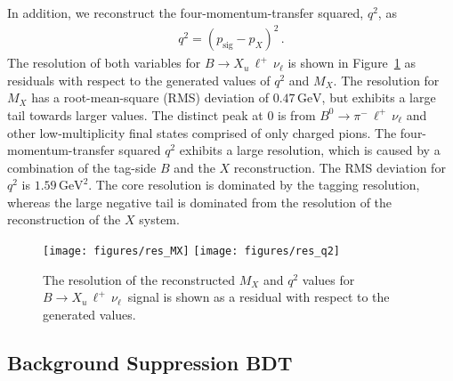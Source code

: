 \documentclass[twocolumn,aps,prd,superscriptaddress,nofootinbib,floatfix,preprintnumbers,a4]{revtex4-1}
\newcommand{\bulnu}{\ensuremath{B \to X_u \, \ell^+\, \nu_{\ell}}\xspace}
\newcommand{\bpichlnu}{\ensuremath{B^0 \to \pi^- \, \ell^+\,\nu_{\ell}}\xspace}
\begin{document}
In addition, we reconstruct the four-momentum-transfer squared, $q^2$, as
\begin{align}
  q^2 = \left(  p_{\mathrm{sig}} - p_X \right)^2 \, .
\end{align}
The resolution of both variables for \bulnu is shown in Figure~\ref{fig:mX_q2_resolution} as residuals with respect to the generated values of $q^2$ and $M_X$. The resolution for $M_X$ has a root-mean-square (RMS) deviation of $0.47 \, \text{GeV}$, but exhibits a large tail towards larger values. The distinct peak at 0 is from \bpichlnu and other low-multiplicity final states comprised of only charged pions. The four-momentum-transfer squared $q^2$ exhibits a large resolution, which is caused by a combination of the tag-side $B$ and the $X$ reconstruction. The RMS deviation for $q^2$ is $1.59 \, \text{GeV}^2$. The core resolution is dominated by the tagging resolution, whereas the large negative tail is dominated from the resolution of the reconstruction of the $X$ system.

\begin{figure}[th!]
  \texttt{[image: figures/res\_MX]} 
  \texttt{[image: figures/res\_q2]} 
\caption{
The resolution of the reconstructed $M_X$ and $q^2$ values for \bulnu\ signal is shown as a residual with respect to the generated values. 
 }
\label{fig:mX_q2_resolution}
\end{figure}

\subsection{Background Suppression BDT}\label{sec:bkg_bdt}
\end{document}
